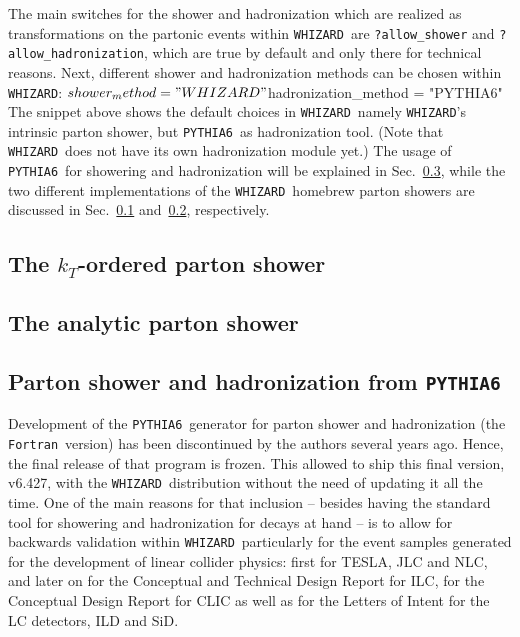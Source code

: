 \documentclass[12pt]{book}
\newenvironment{code}%
  {\begingroup\footnotesize
   \quote
   \Verbatim}%
  {\endVerbatim
   \endquote
   \endgroup\noindent}
\newcommand{\ttt}[1]{\texttt{#1}}
\newcommand{\whizard}{\ttt{WHIZARD}}
\newcommand{\pythiasix}{\ttt{PYTHIA6}}
\newcommand{\fortran}{\ttt{Fortran}}
\begin{document}
The main switches for the shower and hadronization which are realized
as transformations on the partonic events within \whizard\ are
\ttt{?allow\_shower} and \ttt{?allow\_hadronization}, which are
true by default and only there for technical reasons. Next, different
shower and hadronization methods can be chosen within \whizard:
\begin{code}
  $shower_method = "WHIZARD"
  $hadronization_method = "PYTHIA6"
\end{code}
The snippet above shows the default choices in \whizard\, namely
\whizard's intrinsic parton shower, but \pythiasix\ as hadronization
tool. (Note that \whizard\ does not have its own hadronization module
yet.)  The usage of \pythiasix\ for showering and hadronization will
be explained in Sec.~\ref{sec:pythia6}, while the two different
implementations of the \whizard\ homebrew parton showers are discussed
in Sec.~\ref{sec:ktordered} and~\ref{sec:analytic}, respectively.


\subsection{The $k_T$-ordered parton shower}
\label{sec:ktordered}


\subsection{The analytic parton shower}
\label{sec:analytic}


\subsection{Parton shower and hadronization from \pythiasix}
\label{sec:pythia6}

Development of the \pythiasix\ generator for parton shower and
hadronization (the \fortran\ version) has been discontinued by the
authors several years ago. Hence, the final release of that program is
frozen. This allowed to ship this final version, v6.427, with the
\whizard\ distribution without the need of updating it all the
time. One of the main reasons for that inclusion -- besides having the
standard tool for showering and hadronization for decays at hand -- is
to allow for backwards validation within \whizard\ particularly for
the event samples generated for the development of linear collider
physics: first for TESLA, JLC and NLC, and later on for the Conceptual
and Technical Design Report for ILC, for the Conceptual Design Report
for CLIC as well as for the Letters of Intent for the LC detectors,
ILD and SiD.
\end{document}
